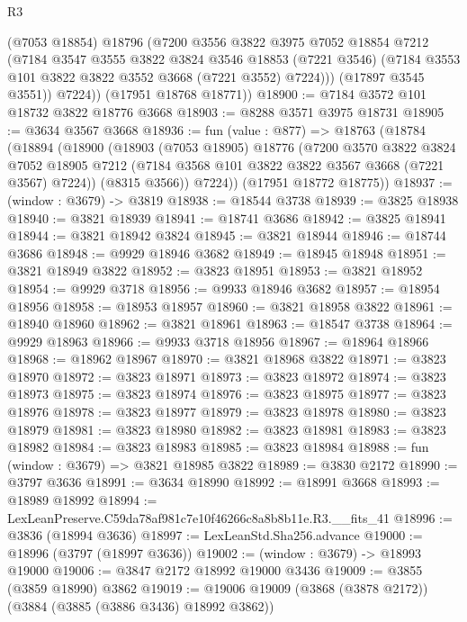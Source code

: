 \begin{lexlean}{R3}
\begin{coremodule}
            (@7053 @18854)
            @18796
            (@7200
              @3556
              @3822
              @3975
              @7052
              @18854
              @7212
              (@7184
                @3547
                @3555
                @3822
                @3824
                @3546
                @18853
                (@7221 @3546)
                (@7184 @3553 @101 @3822 @3822 @3552 @3668 (@7221 @3552) @7224)))
            (@17897 @3545 @3551))
          @7224))
      (@17951 @18768 @18771))
@18900 := @7184 @3572 @101 @18732 @3822 @18776 @3668
@18903 := @8288 @3571 @3975 @18731
@18905 := @3634 @3567 @3668
@18936 := fun (value : @877) =>
  @18763
    (@18784
      (@18894
        (@18900
          (@18903
            (@7053 @18905)
            @18776
            (@7200
              @3570
              @3822
              @3824
              @7052
              @18905
              @7212
              (@7184 @3568 @101 @3822 @3822 @3567 @3668 (@7221 @3567) @7224))
            (@8315 @3566))
          @7224))
      (@17951 @18772 @18775))
@18937 := (window : @3679) -> @3819
@18938 := @18544 @3738
@18939 := @3825 @18938
@18940 := @3821 @18939
@18941 := @18741 @3686
@18942 := @3825 @18941
@18944 := @3821 @18942 @3824
@18945 := @3821 @18944
@18946 := @18744 @3686
@18948 := @9929 @18946 @3682
@18949 := @18945 @18948
@18951 := @3821 @18949 @3822
@18952 := @3823 @18951
@18953 := @3821 @18952
@18954 := @9929 @3718
@18956 := @9933 @18946 @3682
@18957 := @18954 @18956
@18958 := @18953 @18957
@18960 := @3821 @18958 @3822
@18961 := @18940 @18960
@18962 := @3821 @18961
@18963 := @18547 @3738
@18964 := @9929 @18963
@18966 := @9933 @3718 @18956
@18967 := @18964 @18966
@18968 := @18962 @18967
@18970 := @3821 @18968 @3822
@18971 := @3823 @18970
@18972 := @3823 @18971
@18973 := @3823 @18972
@18974 := @3823 @18973
@18975 := @3823 @18974
@18976 := @3823 @18975
@18977 := @3823 @18976
@18978 := @3823 @18977
@18979 := @3823 @18978
@18980 := @3823 @18979
@18981 := @3823 @18980
@18982 := @3823 @18981
@18983 := @3823 @18982
@18984 := @3823 @18983
@18985 := @3823 @18984
@18988 := fun (window : @3679) => @3821 @18985 @3822
@18989 := @3830 @2172
@18990 := @3797 @3636
@18991 := @3634 @18990
@18992 := @18991 @3668
@18993 := @18989 @18992
@18994 := LexLeanPreserve.C59da78af981c7e10f46266c8a8b8b11e.R3.__fits_41
@18996 := @3836 (@18994 @3636)
@18997 := LexLeanStd.Sha256.advance
@19000 := @18996 (@3797 (@18997 @3636))
@19002 := (window : @3679) -> @18993 @19000
@19006 := @3847 @2172 @18992 @19000 @3436
@19009 := @3855 (@3859 @18990) @3862
@19019 := @19006 @19009 (@3868 (@3878 @2172)) (@3884 (@3885 (@3886 @3436) @18992 @3862))

\end{coremodule}
\end{lexlean}
